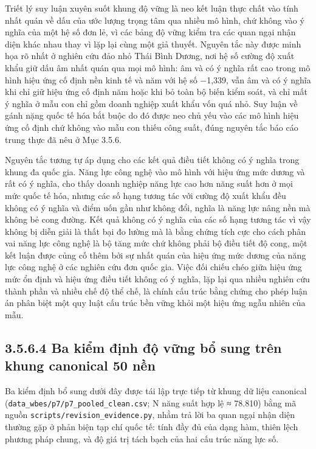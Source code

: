 \documentclass[
  a4paper,
  13pt]{extreport}
\begin{document}
Triết lý suy luận xuyên suốt khung độ vững là neo kết luận thực chất vào
tính nhất quán về dấu của ước lượng trọng tâm qua nhiều mô hình, chứ
không vào ý nghĩa của một hệ số đơn lẻ, vì các bảng độ vững kiểm tra các
quan ngại nhận diện khác nhau thay vì lặp lại cùng một giả thuyết.
Nguyên tắc này được minh họa rõ nhất ở nghiên cứu đảo nhỏ Thái Bình
Dương, nơi hệ số cường độ xuất khẩu giữ dấu âm nhất quán qua mọi mô
hình: âm và có ý nghĩa rất cao trong mô hình hiệu ứng cố định nền kinh
tế và năm với hệ số −1,339, vẫn âm và có ý nghĩa khi chỉ giữ hiệu ứng cố
định năm hoặc khi bỏ toàn bộ biến kiểm soát, và chỉ mất ý nghĩa ở mẫu
con chỉ gồm doanh nghiệp xuất khẩu vốn quá nhỏ. Suy luận về gánh nặng
quốc tế hóa bắt buộc do đó được neo chủ yếu vào các mô hình hiệu ứng cố
định chứ không vào mẫu con thiếu công suất, đúng nguyên tắc báo cáo
trung thực đã nêu ở Mục 3.5.6.

Nguyên tắc tương tự áp dụng cho các kết quả điều tiết không có ý nghĩa
trong khung đa quốc gia. Năng lực công nghệ vào mô hình với hiệu ứng mức
dương và rất có ý nghĩa, cho thấy doanh nghiệp năng lực cao hơn năng
suất hơn ở mọi mức quốc tế hóa, nhưng các số hạng tương tác với cường độ
xuất khẩu đều không có ý nghĩa và điểm uốn gần như không đổi, nghĩa là
năng lực nâng nền mà không bẻ cong đường. Kết quả không có ý nghĩa của
các số hạng tương tác vì vậy không bị diễn giải là thất bại đo lường mà
là bằng chứng tích cực cho cách phân vai năng lực công nghệ là bộ tăng
mức chứ không phải bộ điều tiết độ cong, một kết luận được củng cố thêm
bởi sự nhất quán của hiệu ứng mức dương của năng lực công nghệ ở các
nghiên cứu đơn quốc gia. Việc đối chiếu chéo giữa hiệu ứng mức ổn định
và hiệu ứng điều tiết không có ý nghĩa, lặp lại qua nhiều nghiên cứu
thành phần và nhiều chế độ thể chế, là chính cấu trúc bằng chứng cho
phép luận án phân biệt một quy luật cấu trúc bền vững khỏi một hiệu ứng
ngẫu nhiên của mẫu.

\hypertarget{ba-kiux1ec3m-ux111ux1ecbnh-ux111ux1ed9-vux1eefng-bux1ed5-sung-truxean-khung-canonical-50-nux1ec1n}{%
\subsection{3.5.6.4 Ba kiểm định độ vững bổ sung trên khung canonical 50
nền}\label{ba-kiux1ec3m-ux111ux1ecbnh-ux111ux1ed9-vux1eefng-bux1ed5-sung-truxean-khung-canonical-50-nux1ec1n}}

Ba kiểm định bổ sung dưới đây được tái lập trực tiếp từ khung dữ liệu
canonical (\texttt{data\_wbes/p7/p7\_pooled\_clean.csv}; N năng suất hợp
lệ ≈ 78.810) bằng mã nguồn \texttt{scripts/revision\_evidence.py}, nhằm
trả lời ba quan ngại nhận diện thường gặp ở phản biện tạp chí quốc tế:
tính đầy đủ của dạng hàm, thiên lệch phương pháp chung, và độ giá trị
tách bạch của hai cấu trúc năng lực số.
\end{document}

